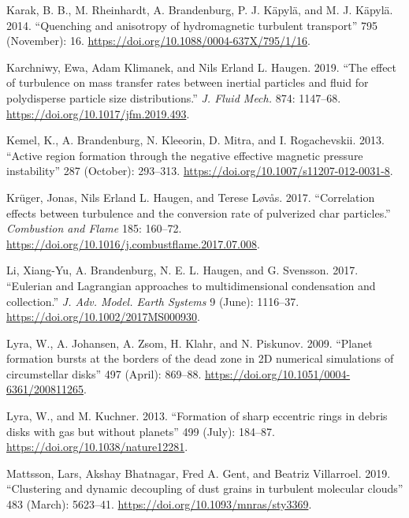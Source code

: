 \documentclass[10pt,a4paper,onecolumn]{article}
\begin{document}
\leavevmode\hypertarget{ref-2014ApJ.795.16K}{}%
Karak, B. B., M. Rheinhardt, A. Brandenburg, P. J. Käpylä, and M. J.
Käpylä. 2014. ``Quenching and anisotropy of hydromagnetic turbulent
transport'' 795 (November): 16.
\url{https://doi.org/10.1088/0004-637X/795/1/16}.

\leavevmode\hypertarget{ref-Karchniwy_etal_2019}{}%
Karchniwy, Ewa, Adam Klimanek, and Nils Erland L. Haugen. 2019. ``The
effect of turbulence on mass transfer rates between inertial particles
and fluid for polydisperse particle size distributions.'' \emph{J. Fluid
Mech.} 874: 1147--68. \url{https://doi.org/10.1017/jfm.2019.493}.

\leavevmode\hypertarget{ref-2013SoPh.287.293K}{}%
Kemel, K., A. Brandenburg, N. Kleeorin, D. Mitra, and I. Rogachevskii.
2013. ``Active region formation through the negative effective magnetic
pressure instability'' 287 (October): 293--313.
\url{https://doi.org/10.1007/s11207-012-0031-8}.

\leavevmode\hypertarget{ref-2017CNF.185a160}{}%
Krüger, Jonas, Nils Erland L. Haugen, and Terese Løvås. 2017.
``Correlation effects between turbulence and the conversion rate of
pulverized char particles.'' \emph{Combustion and Flame} 185: 160--72.
\url{https://doi.org/10.1016/j.combustflame.2017.07.008}.

\leavevmode\hypertarget{ref-2017JAMES.9.1116L}{}%
Li, Xiang-Yu, A. Brandenburg, N. E. L. Haugen, and G. Svensson. 2017.
``Eulerian and Lagrangian approaches to multidimensional condensation
and collection.'' \emph{J. Adv. Model. Earth Systems} 9 (June):
1116--37. \url{https://doi.org/10.1002/2017MS000930}.

\leavevmode\hypertarget{ref-2009Aux5cux26A.497.869L}{}%
Lyra, W., A. Johansen, A. Zsom, H. Klahr, and N. Piskunov. 2009.
``Planet formation bursts at the borders of the dead zone in 2D
numerical simulations of circumstellar disks'' 497 (April): 869--88.
\url{https://doi.org/10.1051/0004-6361/200811265}.

\leavevmode\hypertarget{ref-2013Natur.499.184L}{}%
Lyra, W., and M. Kuchner. 2013. ``Formation of sharp eccentric rings in
debris disks with gas but without planets'' 499 (July): 184--87.
\url{https://doi.org/10.1038/nature12281}.

\leavevmode\hypertarget{ref-2019MNRAS.483.5623M}{}%
Mattsson, Lars, Akshay Bhatnagar, Fred A. Gent, and Beatriz Villarroel.
2019. ``Clustering and dynamic decoupling of dust grains in turbulent
molecular clouds'' 483 (March): 5623--41.
\url{https://doi.org/10.1093/mnras/sty3369}.
\end{document}
